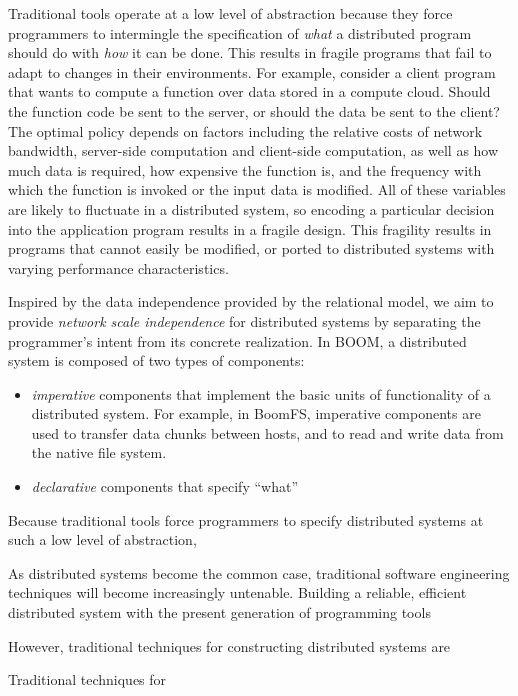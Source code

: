 \documentclass{article}
\begin{document}
Traditional tools operate at a low level of abstraction because they
force programmers to intermingle the specification of \emph{what} a
distributed program should do with \emph{how} it can be done. This
results in fragile programs that fail to adapt to changes in their
environments. For example, consider a client program that wants to
compute a function over data stored in a compute cloud. Should the
function code be sent to the server, or should the data be sent to the
client? The optimal policy depends on factors including the relative
costs of network bandwidth, server-side computation and client-side
computation, as well as how much data is required, how expensive the
function is, and the frequency with which the function is invoked or
the input data is modified. All of these variables are likely to
fluctuate in a distributed system, so encoding a particular decision
into the application program results in a fragile design. This
fragility results in programs that cannot easily be modified, or
ported to distributed systems with varying performance
characteristics.

Inspired by the data independence provided by the relational model, we
aim to provide \emph{network scale independence} for distributed
systems by separating the programmer's intent from its concrete
realization. In BOOM, a distributed system is composed of two types of
components:
\begin{itemize}
\item
  \emph{imperative} components that implement the basic units of
  functionality of a distributed system. For example, in BoomFS,
  imperative components are used to transfer data chunks between
  hosts, and to read and write data from the native file system.

\item
  \emph{declarative} components that specify ``what''

\end{itemize}

Because traditional tools force programmers to specify distributed
systems at such a low level of abstraction, 

As distributed systems become the common case, traditional software
engineering techniques will become increasingly untenable. Building a
reliable, efficient distributed system with the present generation of
programming tools 

However, traditional techniques for constructing distributed systems
are 

Traditional techniques for 
\end{document}
